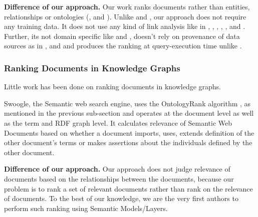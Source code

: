 \noindent \textbf{Difference of our approach.} Our work ranks documents
rather than entities, relationships \cite{anyanwu2005semrank}
or ontologies (\cite{ding2004swoogle}, \cite{ding2005finding}
and \cite{alani2006ranking}).
Unlike \cite{dali2012query} and
\cite{latifi2014query}, our approach does not require any training data.
It does not use any kind of link analysis like in \cite{hogan2006reconrank}, \cite{kasneci2008naga},
\cite{elbassuoni2009language}, \cite{harth2009using}, \cite{wei2009semantic}, \cite{delbru2010hierarchical}
and \cite{graves2008method}.
Further, its not domain specific like \cite{anyanwu2005semrank} and \cite{nie2005object},
doesn't rely on provenance of data sources as in \cite{kasneci2008naga}, \cite{elbassuoni2009language} and \cite{harth2009using} and
produces the ranking at query-execution time unlike \cite{hogan2006reconrank}.

\subsubsection{Ranking Documents in Knowledge Graphs}
\label{sec:graph_doc_ranking}
Little work has been done on ranking documents
in knowledge graphs.

Swoogle, the Semantic web search engine, uses
the OntologyRank algorithm \cite{ding2004swoogle}, \cite{ding2005finding}
as mentioned in the previous sub-section and operates at the document level
as well as the term and RDF graph level. It calculates relevance
of Semantic Web Documents based on whether a document imports,
uses, extends definition of the other document's terms or
makes assertions about the individuals defined by the other document.

\noindent \textbf{Difference of our approach.} Our approach does
not judge relevance of documents based on the relationships
between the documents, because our problem
is to rank a set of relevant documents rather than rank on the relevance
of documents. To the best of our knowledge, we are the very first authors
to perform such ranking using Semantic Models/Layers.